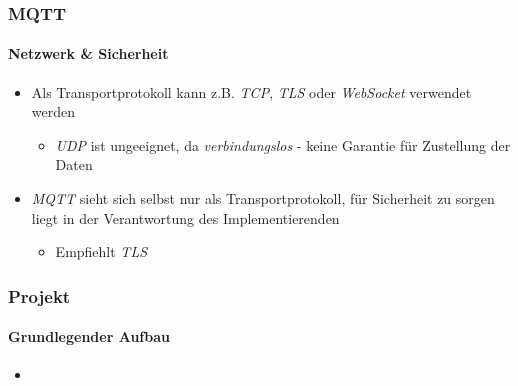 \documentclass{beamer}
\begin{document}
\begin{frame}

\frametitle{MQTT}
\framesubtitle{Netzwerk \& Sicherheit}
\begin{itemize}
	\item Als Transportprotokoll kann z.B. \textit{TCP}, \textit{TLS} oder \textit{WebSocket} verwendet werden
	\begin{itemize}
		\item \textit{UDP} ist ungeeignet, da \textit{verbindungslos} - keine Garantie für Zustellung der Daten
	\end{itemize}
	\item \textit{MQTT} sieht sich selbst nur als Transportprotokoll, für Sicherheit zu sorgen liegt in der Verantwortung des Implementierenden
	\begin{itemize}
		\item Empfiehlt \textit{TLS}
	\end{itemize}
\end{itemize}

\end{frame}

\begin{frame}

\frametitle{Projekt}
\framesubtitle{Grundlegender Aufbau}
\begin{itemize}
	\item 
\end{itemize}

\end{frame}
\end{document}
